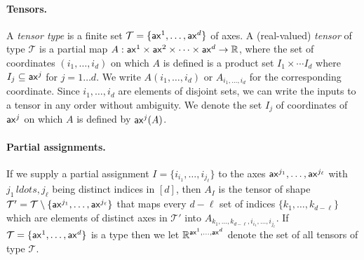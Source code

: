 \documentclass{article}
\begin{document}
\paragraph{Tensors.} A \emph{tensor type} is a finite set $\mathcal{T} = \{ \mathsf{ax}^1,\ldots, \mathsf{ax}^d \}$ of axes.
A  (real-valued) \emph{tensor} of type $\mathcal{T}$ is a partial map $A:\mathsf{ax}^1 \times \mathsf{ax}^2 \times \cdots \times \mathsf{ax}^d \rightarrow \mathbb{R}$,
where the set of coordinates $(i_1,\ldots,i_d)$ on which $A$ is defined is a product set $I_1 \times \cdots I_d$ where $I_j \subseteq \mathsf{ax}^j$ for $j=1 \ldots d$.
We write $A(i_1,\ldots,i_d)$ or $A_{i_1,\ldots,i_d}$ for the corresponding coordinate.
Since $i_1,\ldots,i_d$ are elements of disjoint sets, we can write the inputs to a tensor in any order without ambiguity.
We denote the set $I_j$ of coordinates of $\mathsf{ax}^j$ on which $A$ is defined by $\mathsf{ax}^j(A)$. 


\paragraph{Partial assignments.} If we supply a partial assignment $I = \{ i_{i_1},\ldots,i_{j_\ell} \}$ to the axes $\mathsf{ax}^{j_1},\ldots,\mathsf{ax}^{j_\ell}$ with $j_1\,ldots,j_\ell$ being distinct indices in  $[d]$, then $A_I$ is the tensor of shape $\mathcal{T}' = \mathcal{T} \setminus \{ \mathsf{ax}^{j_1},\ldots,\mathsf{ax}^{j_\ell} \}$ that maps every $d-\ell$ set of indices $\{ k_1,\ldots,k_{d-\ell} \}$ which are elements of distinct axes in $\mathcal{T}'$ into $A_{k_1,\ldots,k_{d-\ell}, i_{i_1},\ldots,i_{j_\ell}}$.
If $\mathcal{T} = \{ \mathsf{ax}^1,\ldots, \mathsf{ax}^d \}$ is a type then we let $\mathbb{R}^{\mathsf{ax}^1,\ldots, \mathsf{ax}^d }$ denote the set of all tensors of type $\mathcal{T}$.
\end{document}
